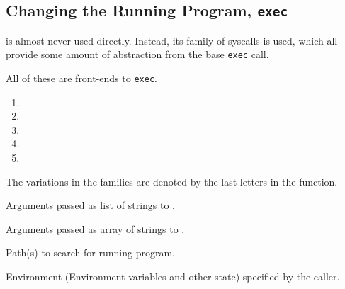 \subsection{Changing the Running Program, \texttt{exec}}\label{subsec:Change_Running_Program-exec}
 is almost never used directly.
Instead, its family of syscalls is used, which all provide some amount of abstraction from the base \texttt{exec} call.

All of these are front-ends to \texttt{exec}.
\begin{enumerate}[noitemsep]
\item {}
\item {}
\item {}
\item {}
\item {}
\end{enumerate}

The variations in the families are denoted by the last letters in the function.
\begin{description}[noitemsep]
\item[\texttt{l}:] Arguments passed as list of strings to .
\item[\texttt{v}:] Arguments passed as array of strings to .
\item[\texttt{p}:] Path(s) to search for running program.
\item[\texttt{e}:] Environment (Environment variables and other state) specified by the caller.
\end{description}


